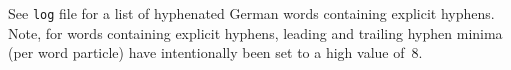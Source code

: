 \documentclass{article}
\begin{document}
See \texttt{log} file for a list of hyphenated German words containing
explicit hyphens.  Note, for words containing explicit hyphens, leading
and trailing hyphen minima (per word particle) have intentionally been
set to a high value of~8.

\begin{otherlanguage}{ngerman}
\end{otherlanguage}
\end{document}
